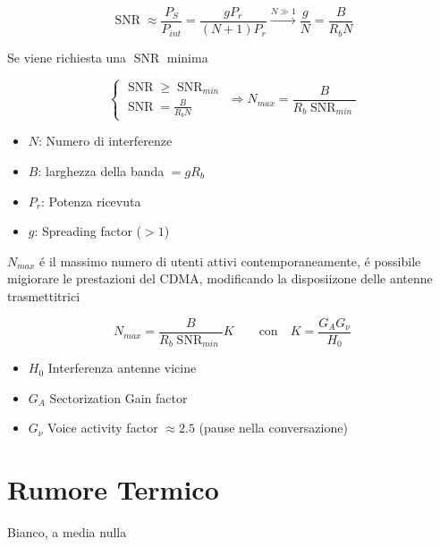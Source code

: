 \documentclass{article}
\DeclareMathOperator\snr{SNR}
\begin{document}
\[ \snr \approx \frac{P_S}{P_{int}} = \frac{g P_r}{(N+1) P_r} \xrightarrow{N \gg 1} \frac{g}{N} = \frac{B}{R_b N} \]

Se viene richiesta una $\snr$ minima

\begin{minipage}{0.5\textwidth}
\[
    \begin{cases}
        \snr \ge \snr_{min}\\
        \snr = \frac{B}{R_b N}
    \end{cases} \Rightarrow N_{max} = \frac{B}{R_b \snr_{min}}
\]
\end{minipage}
\begin{minipage}{0.5\textwidth}
    \begin{itemize}
        \item $N$: Numero di interferenze
        \item $B$: larghezza della banda $=gR_b$
        \item $P_r$: Potenza ricevuta
        \item $g$: Spreading factor ($> 1$)
    \end{itemize}
\end{minipage}

$N_{max}$ \'e il massimo numero di utenti attivi contemporaneamente, \'e possibile migiorare le prestazioni del CDMA, modificando la disposiizone delle antenne trasmettitrici

\begin{minipage}{0.5\textwidth}
\[ N_{max} = \frac{B}{R_b \snr_{min}} K \qquad \text{con} \quad K = \frac{G_A G_\nu}{H_0}\]
\end{minipage}
\begin{minipage}{0.5\textwidth}
    \begin{itemize}
        \item $H_0$ Interferenza antenne vicine
        \item $G_A$ Sectorization Gain factor
        \item $G_\nu$ Voice activity factor $\approx 2.5$ (pause nella conversazione)
    \end{itemize}
\end{minipage}

\section{Rumore Termico}
Bianco, a media nulla
\end{document}
